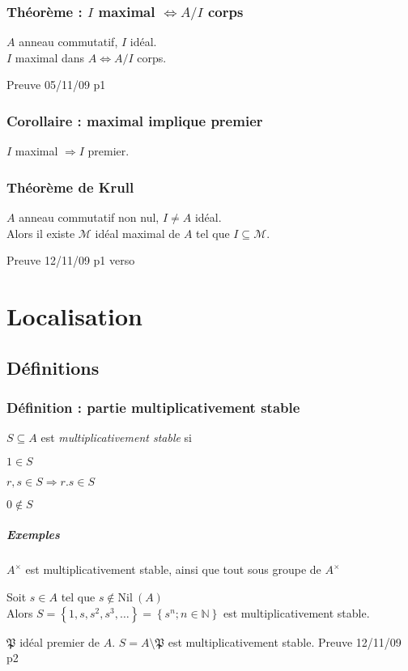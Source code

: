 \documentclass[reqno,a4paper,10pt]{report}
\makeatletter
\newcommand{\set}[1]{\left\lbrace #1 \right\rbrace} %
\newcommand{\nil}{\mathrm{Nil}\:} %
\newcommand{\IN}{\ensuremath{\mathbb{N}}\xspace} %
\newcommand{\so}{\Rightarrow}
\newcommand{\soo}{\Longrightarrow}
\newcommand{\ioi}{\Leftrightarrow} %
\let\olditemize=\itemize%
\renewenvironment{itemize}{%
    \olditemize%
  }{%
    \@noparlisttrue%
    \endlist%
  }%
\let\oldenumerate=\enumerate%
\renewenvironment{enumerate}{%
    \oldenumerate%
  }{%
    \@noparlisttrue%
    \endlist%
  }%
\makeatother
\begin{document}
\subsection{Théorème : $I$ maximal $\ioi A/I$ corps}
$A$ anneau commutatif, $I$ idéal.\\
$I$ maximal dans $A \iff A/I$ corps.

  Preuve 05/11/09 p1

\subsection{Corollaire : maximal implique premier}
$I$ maximal $\soo I$ premier.

\subsection{Théorème de Krull}
$A$ anneau commutatif non nul, $I\neq A$ idéal.\\
Alors il existe $\mathcal{M}$ idéal maximal de $A$ tel que $I\subseteq
\mathcal M$.

  Preuve 12/11/09 p1 verso

\chapter{Localisation}
\section{Définitions}
\subsection{Définition : partie multiplicativement stable}
$S \subseteq A$ est \emph{multiplicativement stable} si
\begin{enumerate}[(i)]
  \item $1\in S$
  \item $r,s \in S \so r.s \in S$
  \item $0 \not\in S$
\end{enumerate}

\paragraph{Exemples}
\begin{itemize}
  \item $A^\times$ est multiplicativement stable, ainsi que tout sous groupe de
    $A^\times$
  \item Soit $s\in A$ tel que $s\not \in \nil(A)$\\
    Alors $S=\set{1,s,s^2,s^3,\dots}=\set{s^n;n\in \IN}$ est
    multiplicativement stable.
  \item $\mathfrak{P}$ idéal premier de $A$. $S=A\setminus \mathfrak P$ est
    multiplicativement stable.
      Preuve 12/11/09 p2
\end{itemize}
\end{document}

